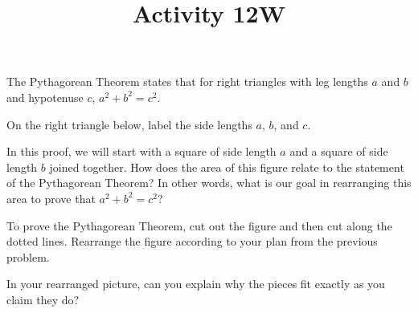 \documentclass[nooutcomes,noauthor]{ximera}
\title{Activity 12W}
\begin{document}
\begin{abstract}
\end{abstract}

\maketitle

The Pythagorean Theorem states that for right triangles with leg lengths $a$ and $b$ and hypotenuse $c$, $a^2 + b^2 = c^2$.
\begin{problem}
On the right triangle below, label the side lengths $a$, $b$, and $c$.
\begin{image}
\end{image}
\end{problem} \vfill

\begin{problem}
In this proof, we will start with a square of side length $a$ and a square of side length $b$ joined together. How does the area of this figure relate to the statement of the Pythagorean Theorem? In other words, what is our goal in rearranging this area to prove that $a^2 + b^2 = c^2$?
\begin{image}
\end{image}
\end{problem} \vfill


\newpage
\begin{problem} 
To prove the Pythagorean Theorem, cut out the figure and then cut along the dotted lines. Rearrange the figure according to your plan from the previous problem.
\begin{image}
\end{image}
\end{problem}

\begin{problem}
In your rearranged picture, can you explain why the pieces fit exactly as you claim they do?
\end{problem}
\end{document}
